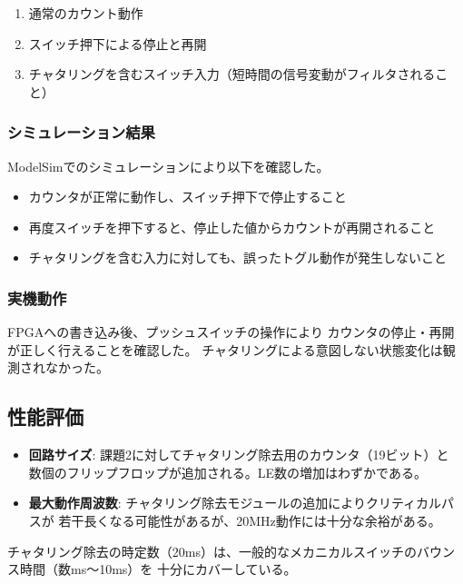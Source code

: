 \documentclass[a4paper,11pt]{ltjsarticle}
\begin{document}
\begin{enumerate}
\item 通常のカウント動作
\item スイッチ押下による停止と再開
\item チャタリングを含むスイッチ入力（短時間の信号変動がフィルタされること）
\end{enumerate}

\subsubsection{シミュレーション結果}

ModelSimでのシミュレーションにより以下を確認した。

\begin{itemize}
\item カウンタが正常に動作し、スイッチ押下で停止すること
\item 再度スイッチを押下すると、停止した値からカウントが再開されること
\item チャタリングを含む入力に対しても、誤ったトグル動作が発生しないこと
\end{itemize}

\subsubsection{実機動作}

FPGAへの書き込み後、プッシュスイッチの操作により
カウンタの停止・再開が正しく行えることを確認した。
チャタリングによる意図しない状態変化は観測されなかった。

\subsection{性能評価}

\begin{itemize}
\item \textbf{回路サイズ}: 課題2に対してチャタリング除去用のカウンタ（19ビット）と
  数個のフリップフロップが追加される。LE数の増加はわずかである。
\item \textbf{最大動作周波数}: チャタリング除去モジュールの追加によりクリティカルパスが
  若干長くなる可能性があるが、20MHz動作には十分な余裕がある。
\end{itemize}

チャタリング除去の時定数（20ms）は、一般的なメカニカルスイッチのバウンス時間（数ms〜10ms）を
十分にカバーしている。


\end{document}
